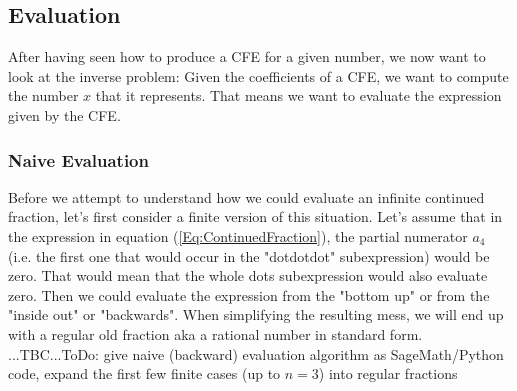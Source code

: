 




\subsection{Evaluation}
After having seen how to produce a CFE for a given number, we now want to look at the inverse problem: Given the coefficients of a CFE, we want to compute the number $x$ that it represents. That means we want to evaluate the expression given by the CFE.

\subsubsection{Naive Evaluation}
Before we attempt to understand how we could evaluate an infinite continued fraction, let's first consider a finite version of this situation. Let's assume that in the expression in equation (\ref{Eq:ContinuedFraction}), the partial numerator $a_4$ (i.e. the first one that would occur in the "dotdotdot" subexpression) would be zero. That would mean that the whole dots subexpression would also evaluate zero. Then we could evaluate the expression from the "bottom up" or from the "inside out" or "backwards". When simplifying the resulting mess, we will end up with a regular old fraction aka a rational number in standard form. ...TBC...ToDo: give naive (backward) evaluation algorithm as SageMath/Python code, expand the first few finite cases (up to $n=3$) into regular fractions



